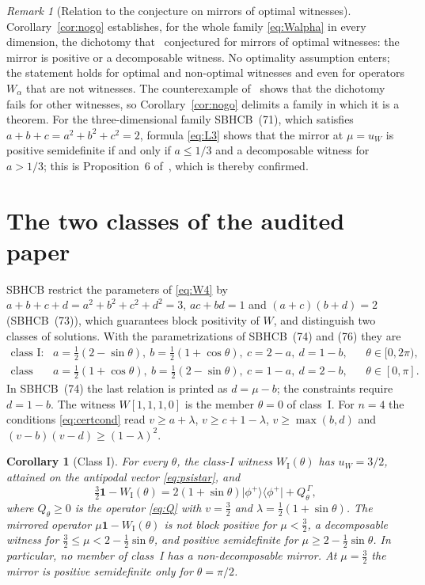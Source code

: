 \documentclass[11pt,a4paper]{article}
\newtheorem{corollary}[theorem]{Corollary}
\theoremstyle{remark}
\newtheorem{remark}[theorem]{Remark}
\newcommand{\ketbra}[2]{\lvert #1\rangle\langle #2\rvert}
\newcommand{\id}{\mathbf{1}}
\newcommand{\G}{\Gamma}
\newcommand{\uW}{u_W}
\begin{document}
\begin{remark}[Relation to the conjecture on mirrors of optimal witnesses]\label{rem:conj}
Corollary~\ref{cor:nogo} establishes, for the whole family \eqref{eq:Walpha} in every
dimension, the dichotomy that~\cite{BBHC23} conjectured for mirrors of optimal witnesses:
the mirror is positive or a decomposable witness. No optimality assumption enters; the
statement holds for optimal and non-optimal witnesses and even for operators $W_\alpha$
that are not witnesses. The counterexample of~\cite{CBBH25} shows that the dichotomy
fails for other witnesses, so Corollary~\ref{cor:nogo} delimits a family in which it is a
theorem. For the three-dimensional family SBHCB~(71), which satisfies
$a+b+c=a^2+b^2+c^2=2$, formula \eqref{eq:L3} shows that the mirror at $\mu=\uW$ is
positive semidefinite if and only if $a\le1/3$ and a decomposable witness for $a>1/3$;
this is Proposition~6 of~\cite{SBHCB26}, which is thereby confirmed.
\end{remark}

\section{The two classes of the audited paper}\label{sec:classes}

SBHCB restrict the parameters of \eqref{eq:W4} by $a+b+c+d=a^2+b^2+c^2+d^2=3$, $ac+bd=1$
and $(a+c)(b+d)=2$ (SBHCB~(73)), which guarantees block positivity of $W$, and
distinguish two classes of solutions. With the parametrizations of SBHCB~(74) and (76)
they are
\begin{align}
\text{class I:}\quad& a=\tfrac12(2-\sin\theta),\ b=\tfrac12(1+\cos\theta),\ c=2-a,\ d=1-b,
&&\theta\in[0,2\pi),\label{eq:classI}\\
\text{class II:}\quad& a=\tfrac12(1+\cos\theta),\ b=\tfrac12(2-\sin\theta),\ c=1-a,\ d=2-b,
&&\theta\in[0,\pi].\label{eq:classII}
\end{align}
In SBHCB~(74) the last relation is printed as $d=\mu-b$; the constraints require $d=1-b$.
The witness $W[1,1,1,0]$ is the member $\theta=0$ of class~I. For $n=4$ the conditions
\eqref{eq:certcond} read $v\ge a+\lambda$, $v\ge c+1-\lambda$, $v\ge\max(b,d)$ and
$(v-b)(v-d)\ge(1-\lambda)^2$.

\begin{corollary}[Class I]\label{cor:classI}
For every $\theta$, the class-I witness $W_{\mathrm I}(\theta)$ has $\uW=3/2$, attained
on the antipodal vector \eqref{eq:psistar}, and
\begin{equation}\label{eq:decI}
\tfrac32\id-W_{\mathrm I}(\theta)=2(1+\sin\theta)\ketbra{\phi^+}{\phi^+}+Q_\theta^{\,\G},
\end{equation}
where $Q_\theta\ge0$ is the operator \eqref{eq:Q} with $v=\tfrac32$ and
$\lambda=\tfrac12(1+\sin\theta)$. The mirrored operator $\mu\id-W_{\mathrm I}(\theta)$ is
not block positive for $\mu<\tfrac32$, a decomposable witness for
$\tfrac32\le\mu<2-\tfrac12\sin\theta$, and positive semidefinite for
$\mu\ge2-\tfrac12\sin\theta$. In particular, no member of class~I has a non-decomposable
mirror. At $\mu=\tfrac32$ the mirror is positive semidefinite only for $\theta=\pi/2$.
\end{corollary}
\end{document}
